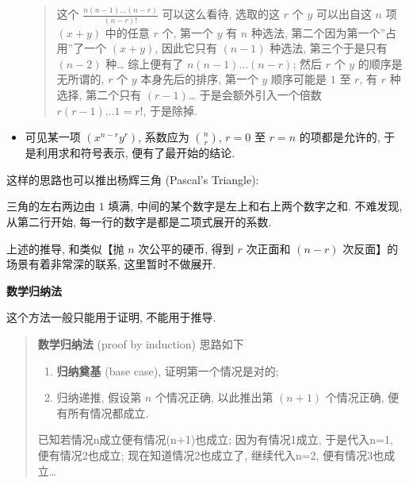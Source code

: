 \begin{itemize}
  \begin{quote}
  这个 \(\frac{n(n-1)...(n-r)}{(n-r)!}\) 可以这么看待, 选取的这 \(r\) 个
  \(y\) 可以出自这 \(n\) 项 \((x+y)\) 中的任意 \(r\) 个, 第一个 \(y\) 有
  \(n\) 种选法, 第二个因为第一个''占用''了一个 \((x+y)\), 因此它只有
  \((n-1)\) 种选法, 第三个于是只有 \((n-2)\) 种\ldots{} 综上便有了
  \(n(n-1)...(n-r)\); 然后 \(r\) 个 \(y\) 的顺序是无所谓的, \(r\) 个
  \(y\) 本身先后的排序, 第一个 \(y\) 顺序可能是 \(1\) 至 \(r\), 有 \(r\)
  种选择, 第二个只有 \((r-1)\)\ldots{} 于是会额外引入一个倍数
  \(r(r-1)...1=r!\), 于是除掉.
  \end{quote}
\item
  可见某一项 \((x^{n-r}y^r)\), 系数应为 \(\binom{n}{r}\), \(r=0\) 至
  \(r=n\) 的项都是允许的, 于是利用求和符号表示, 便有了最开始的结论.
\end{itemize}

这样的思路也可以推出杨辉三角 (Pascal's Triangle):

\begin{Shaded}
\begin{Highlighting}[]
     
      
       
        
\end{Highlighting}
\end{Shaded}

三角的左右两边由 \(1\) 填满, 中间的某个数字是左上和右上两个数字之和.
不难发现, 从第二行开始, 每一行的数字是都是二项式展开的系数.

上述的推导, 和类似【抛 \(n\) 次公平的硬币, 得到 \(r\) 次正面和 \((n-r)\)
次反面】的场景有着非常深的联系, 这里暂时不做展开.

\textbf{数学归纳法}

这个方法一般只能用于证明, 不能用于推导.

\begin{quote}
\textbf{数学归纳法} (proof by induction) 思路如下

\begin{enumerate}
\def\labelenumi{\arabic{enumi}.}
\tightlist
\item
  \textbf{归纳奠基} (base case), 证明第一个情况是对的;
\item
  归纳递推, 假设第 \(n\) 个情况正确, 以此推出第 \((n+1)\) 个情况正确,
  便有所有情况都成立.
\end{enumerate}

已知若情况n成立便有情况(n+1)也成立; 因为有情况1成立, 于是代入n=1,
便有情况2也成立; 现在知道情况2也成立了, 继续代入n=2,
便有情况3也成立\ldots{}
\end{quote}

